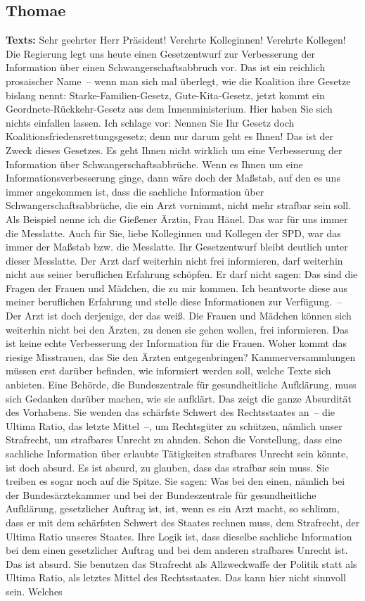 \documentclass{article}
\begin{document}
\subsection{Thomae}
\noindent\textbf{Texts:} Sehr geehrter Herr Präsident! Verehrte Kolleginnen! Verehrte Kollegen! Die Regierung legt uns heute einen Gesetzentwurf zur Verbesserung der Information über einen Schwangerschaftsabbruch vor. Das ist ein reichlich prosaischer Name – wenn man sich mal überlegt, wie die Koalition ihre Gesetze bislang nennt: Starke-Familien-Gesetz, Gute-Kita-Gesetz, jetzt kommt ein Geordnete-Rückkehr-Gesetz aus dem Innenministerium. Hier haben Sie sich nichts einfallen lassen. Ich schlage vor: Nennen Sie Ihr Gesetz doch Koalitionsfriedensrettungsgesetz; denn nur darum geht es Ihnen! Das ist der Zweck dieses Gesetzes.  Es geht Ihnen nicht wirklich um eine Verbesserung der Information über Schwangerschaftsabbrüche.  Wenn es Ihnen um eine Informationsverbesserung ginge, dann wäre doch der Maßstab, auf den es uns immer angekommen ist, dass die sachliche Information über Schwangerschaftsabbrüche, die ein Arzt vornimmt, nicht mehr strafbar sein soll. Als Beispiel nenne ich die Gießener Ärztin, Frau Hänel. Das war für uns immer die Messlatte. Auch für Sie, liebe Kolleginnen und Kollegen der SPD, war das immer der Maßstab bzw. die Messlatte.  Ihr Gesetzentwurf bleibt deutlich unter dieser Messlatte. Der Arzt darf weiterhin nicht frei informieren, darf weiterhin nicht aus seiner beruflichen Erfahrung schöpfen.  Er darf nicht sagen: Das sind die Fragen der Frauen und Mädchen, die zu mir kommen. Ich beantworte diese aus meiner beruflichen Erfahrung und stelle diese Informationen zur Verfügung. – Der Arzt ist doch derjenige, der das weiß.  Die Frauen und Mädchen können sich weiterhin nicht bei den Ärzten, zu denen sie gehen wollen, frei informieren. Das ist keine echte Verbesserung der Information für die Frauen.  Woher kommt das riesige Misstrauen, das Sie den Ärzten entgegenbringen? Kammerversammlungen müssen erst darüber befinden, wie informiert werden soll, welche Texte sich anbieten. Eine Behörde, die Bundeszentrale für gesundheitliche Aufklärung, muss sich Gedanken darüber machen, wie sie aufklärt. Das zeigt die ganze Absurdität des Vorhabens.  Sie wenden das schärfste Schwert des Rechtsstaates an – die Ultima Ratio, das letzte Mittel –, um Rechtsgüter zu schützen, nämlich unser Strafrecht, um strafbares Unrecht zu ahnden. Schon die Vorstellung, dass eine sachliche Information über erlaubte Tätigkeiten strafbares Unrecht sein könnte, ist doch absurd. Es ist absurd, zu glauben, dass das strafbar sein muss.  Sie treiben es sogar noch auf die Spitze. Sie sagen: Was bei den einen, nämlich bei der Bundesärztekammer und bei der Bundeszentrale für gesundheitliche Aufklärung, gesetzlicher Auftrag ist, ist, wenn es ein Arzt macht, so schlimm, dass er mit dem schärfsten Schwert des Staates rechnen muss, dem Strafrecht, der Ultima Ratio unseres Staates.  Ihre Logik ist, dass dieselbe sachliche Information bei dem einen gesetzlicher Auftrag und bei dem anderen strafbares Unrecht ist. Das ist absurd.  Sie benutzen das Strafrecht als Allzweckwaffe der Politik statt als Ultima Ratio, als letztes Mittel des Rechtsstaates. Das kann hier nicht sinnvoll sein.  Welches 
\end{document}
